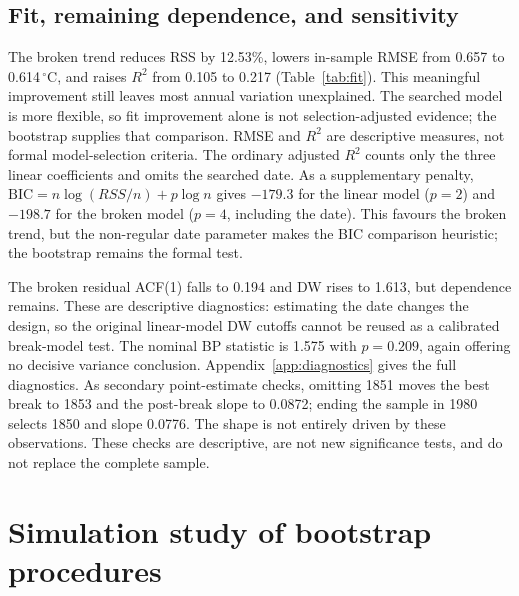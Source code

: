 \documentclass[11pt,a4paper]{article}
\newcommand{\degC}{\ensuremath{^{\circ}\mathrm C}}
\begin{document}
\subsection{Fit, remaining dependence, and sensitivity}
The broken trend reduces RSS by 12.53\%, lowers in-sample RMSE from 0.657 to 0.614\,\degC, and raises $R^2$ from 0.105 to 0.217 (Table~\ref{tab:fit}). This meaningful improvement still leaves most annual variation unexplained. The searched model is more flexible, so fit improvement alone is not selection-adjusted evidence; the bootstrap supplies that comparison. RMSE and $R^2$ are descriptive measures, not formal model-selection criteria. The ordinary adjusted $R^2$ counts only the three linear coefficients and omits the searched date. As a supplementary penalty, $\mathrm{BIC}=n\log(RSS/n)+p\log n$ gives $-179.3$ for the linear model ($p=2$) and $-198.7$ for the broken model ($p=4$, including the date). This favours the broken trend, but the non-regular date parameter makes the BIC comparison heuristic; the bootstrap remains the formal test.

\begin{table}[htbp]\centering\small
\caption{In-sample fit and residual dependence. ACF(1) counts observation lags. RSS is in \degC$^2$ and RMSE in \degC.}\label{tab:fit}\end{table}

The broken residual ACF(1) falls to 0.194 and DW rises to 1.613, but dependence remains. These are descriptive diagnostics: estimating the date changes the design, so the original linear-model DW cutoffs cannot be reused as a calibrated break-model test. The nominal BP statistic is 1.575 with $p=0.209$, again offering no decisive variance conclusion. Appendix~\ref{app:diagnostics} gives the full diagnostics. As secondary point-estimate checks, omitting 1851 moves the best break to 1853 and the post-break slope to 0.0872; ending the sample in 1980 selects 1850 and slope 0.0776. The shape is not entirely driven by these observations. These checks are descriptive, are not new significance tests, and do not replace the complete sample.

\section{Simulation study of bootstrap procedures}
\end{document}
